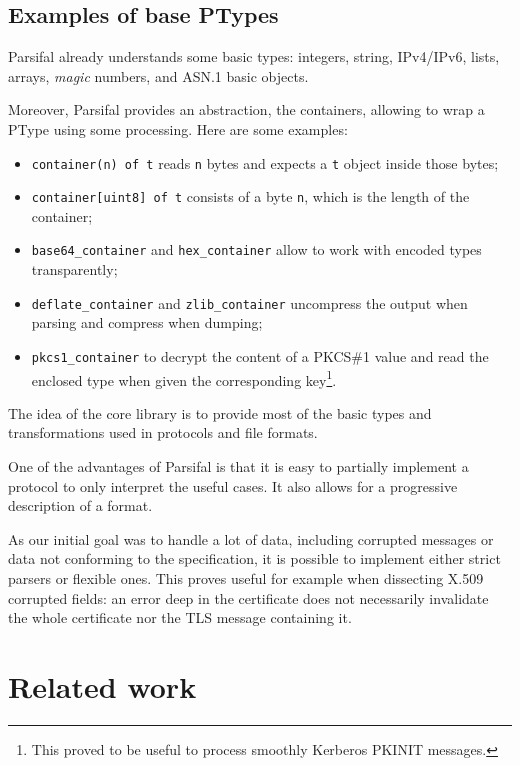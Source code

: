\documentclass{article}
\begin{document}
\subsection{Examples of base PTypes}

Parsifal already understands some basic types: integers, string,
IPv4/IPv6, lists, arrays, \emph{magic} numbers, and ASN.1 basic
objects.

Moreover, Parsifal provides an abstraction, the containers, allowing
to wrap a PType using some processing. Here are some examples:
\begin{itemize}
\item \texttt{container(n) of t} reads \texttt{n} bytes and expects a
  \texttt{t} object inside those bytes;
\item \texttt{container[uint8] of t} consists of a byte \texttt{n},
  which is the length of the container;
\item \texttt{base64\_container} and \texttt{hex\_container} allow to
  work with encoded types transparently;
\item \texttt{deflate\_container} and \texttt{zlib\_container}
  uncompress the output when parsing and compress when dumping;
\item \texttt{pkcs1\_container} to decrypt the content of a PKCS\#1
  value and read the enclosed type when given the corresponding
  key\footnote{This proved to be useful to process smoothly Kerberos
    PKINIT messages.}.
\end{itemize}

The idea of the core library is to provide most of the basic types and
transformations used in protocols and file formats.

One of the advantages of Parsifal is that it is easy to partially
implement a protocol to only interpret the useful cases. It also
allows for a progressive description of a format.

As our initial goal was to handle a lot of data, including corrupted
messages or data not conforming to the specification, it is possible to
implement either strict parsers or flexible ones. This proves useful
for example when dissecting X.509 corrupted fields: an error deep in
the certificate does not necessarily invalidate the whole certificate
nor the TLS message containing it.



\section{Related work}
\end{document}

